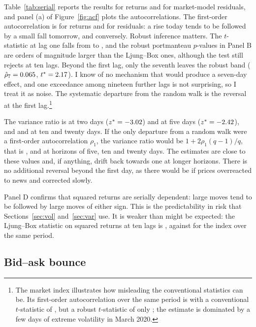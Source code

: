 \documentclass[11pt,a4paper]{article}
\begin{document}
Table~\ref{tab:serial} reports the results for returns and for market-model residuals, and panel (a) of Figure~\ref{fig:acf} plots the autocorrelations. The first-order autocorrelation is \rhoOne{} for returns and \rhoOneRes{} for residuals: a rise today tends to be followed by a small fall tomorrow, and conversely. Robust inference matters. The $t$-statistic at lag one falls from \rhoOneT{} to \rhoOneTrob{}, and the robust portmanteau $p$-values in Panel B are orders of magnitude larger than the Ljung--Box ones, although the test still rejects at ten lags. Beyond the first lag, only the seventh leaves the robust band ($\hat\rho_7=0.065$, $t^{*}=2.17$). I know of no mechanism that would produce a seven-day effect, and one exceedance among nineteen further lags is not surprising, so I treat it as noise. The systematic departure from the random walk is the reversal at the first lag.\footnote{The market index illustrates how misleading the conventional statistics can be. Its first-order autocorrelation over the same period is \xaoRhoOne{} with a conventional $t$-statistic of \xaoRhoOneT{}, but a robust $t$-statistic of only \xaoRhoOneTrob{}; the estimate is dominated by a few days of extreme volatility in March 2020.}

The variance ratio is \vrTwo{} at two days ($z^{*}=-3.02$) and \vrFive{} at five days ($z^{*}=-2.42$), and \vrTen{} and \vrTwenty{} at ten and twenty days. If the only departure from a random walk were a first-order autocorrelation $\rho_1$, the variance ratio would be $1+2\rho_1(q-1)/q$, that is \vrImpFive, \vrImpTen{} and \vrImpTwenty{} at horizons of five, ten and twenty days. The estimates are close to these values and, if anything, drift back towards one at longer horizons. There is no additional reversal beyond the first day, as there would be if prices overreacted to news and corrected slowly.

Panel D confirms that squared returns are serially dependent: large moves tend to be followed by large moves of either sign. This is the predictability in risk that Sections~\ref{sec:vol} and~\ref{sec:var} use. It is weaker than might be expected: the Ljung--Box statistic on squared returns at ten lags is \qTwoTen{}, against \qTwoTenXao{} for the index over the same period.

\subsection{Bid--ask bounce}
\end{document}
